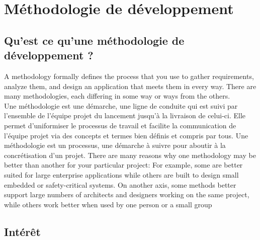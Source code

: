 \chapter{Méthodologie de développement}

\section{Qu'est ce qu'une méthodologie de développement ?}
A methodology formally defines the process that you use to gather requirements, analyze them, and design an application that meets them in every way. There are many methodologies, each differing in some way or ways from the others. \\
Une méthodologie est une démarche, une ligne de conduite qui est suivi par l’ensemble de l’équipe projet du lancement jusqu’à la livraison de celui-ci. Elle permet d’uniformiser le processus de travail et facilite la communication de l’équipe projet via des concepts et termes bien définis et compris par tous.
Une méthodologie est un processus, une démarche à suivre pour aboutir à la concrétisation d'un projet.
There are many reasons why one methodology may be better than another for your particular project: For example, some are better suited for large enterprise applications while others are built to design small embedded or safety-critical systems. On another axis, some methods better support large numbers of architects and designers working on the same project, while others work better when used by one person or a small group

\section{Intérêt}



                             
